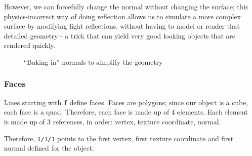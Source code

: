 \documentclass{scrartcl}
\begin{document}
However, we can forcefully change the normal without changing the surface; this physics-incorrect way of doing reflection allows us to simulate a more complex surface by modifying light reflections, without having to model or render that detailed geometry - a trick that can yield very good looking objects that are rendered quickly.

\pagebreak

\begin{figure}[ht!]
  \center
{}
\caption{``Baking in'' normals to simplify the geometry}
\end{figure}

\subsubsection{Faces}

Lines starting with \lstinline{f} define faces. Faces are polygons; since our object is a cube, each face is a quad. Therefore, each face is made up of $4$ elements. Each element is made up of 3 references, in order: vertex, texture coordinate, normal.

Therefore, \lstinline{1/1/1} points to the first vertex, first texture coordinate and first normal defined for the object:
\end{document}
